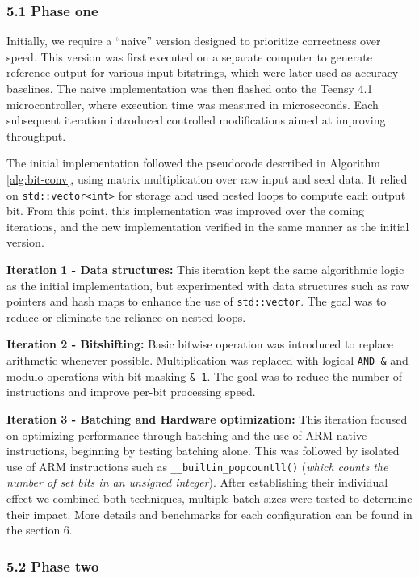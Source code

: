 \documentclass{sigchi}
\begin{document}
\subsubsection{5.1 Phase one}\label{phase-one}

Initially, we require a ``naive'' version designed to prioritize correctness over speed. This version was first executed on a separate computer to generate reference output for various input bitstrings, which were later used as accuracy baselines. The naive implementation was then flashed onto the Teensy 4.1 microcontroller, where execution time was measured in microseconds. Each subsequent iteration introduced controlled modifications aimed at improving throughput.

The initial implementation followed the pseudocode described in Algorithm \ref{alg:bit-conv}, using matrix multiplication over raw input and seed data. It relied on \texttt{std::vector\textless{}int\textgreater{}} for storage and used nested loops to compute each output bit. From this point, this implementation was improved over the coming iterations, and the new implementation verified in the same manner as the initial version.

\textbf{Iteration 1 - Data structures:} This iteration kept the same algorithmic logic as the initial implementation, but experimented with data structures such as raw pointers and hash maps to enhance the use of \texttt{std::vector}. The goal was to reduce or eliminate the reliance on nested loops.

\textbf{Iteration 2 - Bitshifting:} Basic bitwise operation was introduced to replace arithmetic whenever possible. Multiplication was replaced with logical \texttt{AND\ \&} and modulo operations with bit masking \texttt{\&\ 1}. The goal was to reduce the number of instructions and improve per-bit processing speed.

\textbf{Iteration 3 - Batching and Hardware optimization:} This iteration focused on optimizing performance through batching and the use of ARM-native instructions, beginning by testing batching alone. This was followed by isolated use of ARM instructions such as \texttt{\_\_builtin\_popcountll()} (\emph{which counts the number of set bits in an unsigned integer}). After establishing their individual effect we combined both techniques, multiple batch sizes were tested to determine their impact. More details and benchmarks for each configuration can be found in the section 6.

\subsubsection{5.2 Phase two}\label{phase-two}
\end{document}
